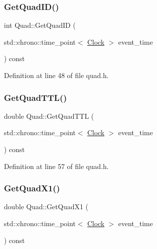 \subsubsection{\texorpdfstring{Get\+Quad\+I\+D()}{GetQuadID()}}
{\footnotesize\ttfamily int Quad\+::\+Get\+Quad\+ID (\begin{DoxyParamCaption}\item[{std\+::chrono\+::time\+\_\+point$<$ \mbox{\hyperlink{universe_8h_a0ef8d951d1ca5ab3cfaf7ab4c7a6fd80}{Clock}} $>$}]{event\+\_\+time }\end{DoxyParamCaption}) const\hspace{0.3cm}{\ttfamily [inline]}}



Definition at line 48 of file quad.\+h.

\mbox{\label{class_quad_ab17ff4d689675e80107ecf6588811eee}} 
\subsubsection{\texorpdfstring{Get\+Quad\+T\+T\+L()}{GetQuadTTL()}}
{\footnotesize\ttfamily double Quad\+::\+Get\+Quad\+T\+TL (\begin{DoxyParamCaption}\item[{std\+::chrono\+::time\+\_\+point$<$ \mbox{\hyperlink{universe_8h_a0ef8d951d1ca5ab3cfaf7ab4c7a6fd80}{Clock}} $>$}]{event\+\_\+time }\end{DoxyParamCaption}) const\hspace{0.3cm}{\ttfamily [inline]}}



Definition at line 57 of file quad.\+h.

\mbox{\label{class_quad_a7b0e34a18832713528b861f7ed35e139}} 
\subsubsection{\texorpdfstring{Get\+Quad\+X1()}{GetQuadX1()}}
{\footnotesize\ttfamily double Quad\+::\+Get\+Quad\+X1 (\begin{DoxyParamCaption}\item[{std\+::chrono\+::time\+\_\+point$<$ \mbox{\hyperlink{universe_8h_a0ef8d951d1ca5ab3cfaf7ab4c7a6fd80}{Clock}} $>$}]{event\+\_\+time }\end{DoxyParamCaption}) const\hspace{0.3cm}{\ttfamily [inline]}}



